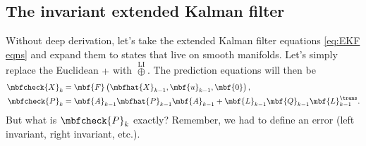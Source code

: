\documentclass[nobib]{tufte-handout}
\newcommand{\liplus}{\overset{{\scriptscriptstyle\mathrm{LI}}}{\oplus}}
\begin{document}
    \subsection{The invariant extended Kalman filter}
    Without deep derivation, let's take the extended Kalman filter equations \eqref{eq:EKF eqns} and expand them to states that live on smooth manifolds. Let's simply replace the Euclidean $+$ with $\liplus$. The prediction equations will then be
    \begin{align}
        \mbfcheck{X}_{k} &= \mbf{F}\left( \mbfhat{X}_{k-1}, \mbf{u}_{k-1}, \mbf{0} \right),\\
        \mbfcheck{P}_{k} &= \mbf{A}_{k-1}\mbfhat{P}_{k-1}\mbf{A}_{k-1} + \mbf{L}_{k-1}\mbf{Q}_{k-1}\mbf{L}_{k-1}^{\trans}.
    \end{align}
    But what is $\mbfcheck{P}_{k}$ exactly? Remember, we had to define an error (left invariant, right invariant, etc.).

    

    
    
\end{document}
